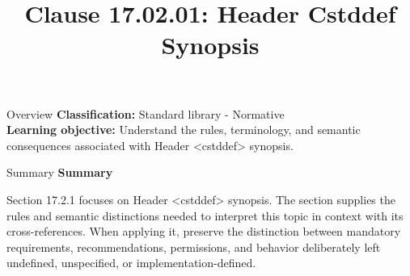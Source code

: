 \documentclass[10pt,letterpaper]{article}
\title{Clause 17.02.01: Header Cstddef Synopsis}
\author{}
\date{}
\begin{document}
\maketitle
\begin{CornellOverviewBox}{Overview}
\textbf{Classification:} Standard library - Normative\\[2pt]
\textbf{Learning objective:} Understand the rules, terminology, and semantic consequences associated with Header <cstddef> synopsis.
\end{CornellOverviewBox}\begin{CornellSummaryBox}{Summary}
{\sffamily\bfseries\color{Accent} Summary}\par\vspace{3pt}Section 17.2.1 focuses on Header <cstddef> synopsis. The section supplies the rules and semantic distinctions needed to interpret this topic in context with its cross-references. When applying it, preserve the distinction between mandatory requirements, recommendations, permissions, and behavior deliberately left undefined, unspecified, or implementation-defined.
\end{CornellSummaryBox}
\end{document}

